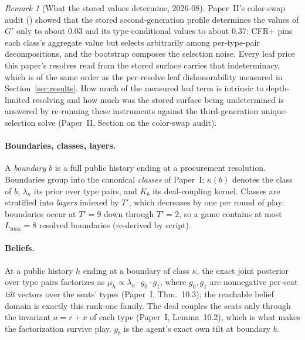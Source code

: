 \documentclass[11pt]{article}
\theoremstyle{plain}
\theoremstyle{definition}
\theoremstyle{remark}
\newtheorem{remark}[theorem]{Remark}
\newcommand{\gp}{\ensuremath{G'}}
\begin{document}
\begin{remark}[What the stored values determine, 2026-08]
\sloppy Paper~II's color-swap audit
() showed that the stored
second-generation profile determines the values of $\gp$ only to
about $0.03$ and its type-conditional values to about $0.37$: CFR+
pins each class's aggregate value but selects arbitrarily among
per-type-pair decompositions, and the bootstrap composes the
selection noise. Every leaf price this paper's resolves read from the
stored surface carries that indeterminacy, which is of the same order
as the per-resolve leaf dishonorability measured in
Section~\ref{sec:results}. How much of the measured leaf term is
intrinsic to depth-limited resolving and how much was the stored
surface being undetermined is answered by re-running these
instruments against the third-generation unique-selection solve
(Paper~II, Section on the color-swap audit).
\end{remark}

\paragraph{Boundaries, classes, layers.} A \emph{boundary} $b$ is a
full public history ending at a procurement resolution. Boundaries
group into the canonical \emph{classes} of Paper~I; $\kappa(b)$
denotes the class of $b$, $\lambda_\kappa$ its prior over type pairs,
and $K_b$ its deal-coupling kernel. Classes are stratified into
\emph{layers} indexed by $T'$, which decreases by one per round of
play: boundaries occur at $T'=9$ down through $T'=2$, so a game
contains at most $L_{\max}=8$ resolved boundaries (re-derived by
script).

\paragraph{Beliefs.} At a public history $h$ ending at a boundary of
class $\kappa$, the exact joint posterior over type pairs factorizes
as $\mu_h \propto \lambda_\kappa\cdot g_0\cdot g_1$, where $g_0,g_1$
are nonnegative per-seat \emph{tilt} vectors over the seats' types
(Paper~I, Thm.~10.3); the reachable belief domain is exactly this
rank-one family. The deal couples the seats only through the invariant
$a=r+x$ of each type (Paper~I, Lemma~10.2), which is what makes the
factorization survive play. $g_b$ is the agent's exact own tilt at
boundary $b$.
\end{document}
